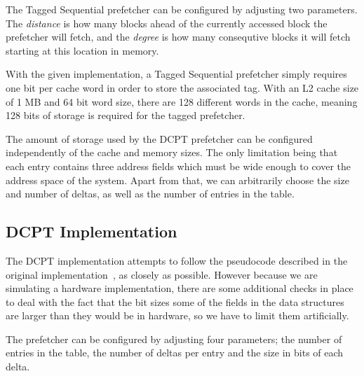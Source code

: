 
The Tagged Sequential prefetcher can be configured by adjusting two parameters.
The \emph{distance} is how many blocks ahead of the currently accessed block the
prefetcher will fetch, and the \emph{degree} is how many consequtive blocks it will
fetch starting at this location in memory.

With the given implementation, a Tagged Sequential prefetcher simply requires
one bit per cache word in order to store the associated tag. With an L2 cache
size of 1 MB and 64 bit word size, there are 128 different words in the cache,
meaning 128 bits of storage is required for the tagged prefetcher.

The amount of storage used by the DCPT prefetcher can be configured
independently of the cache and memory sizes. The only limitation being that each
entry contains three address fields which must be wide enough to cover the
address space of the system. Apart from that, we can arbitrarily choose the size
and number of deltas, as well as the number of entries in the table.


\subsection{DCPT Implementation}


The DCPT implementation attempts to follow the pseudocode described in the
original implementation~\cite{dcpt}, as closely as possible. However because we
are simulating a hardware implementation, there are some additional checks in
place to deal
with the fact that the bit sizes some of the fields in the data
structures are larger than they would be in hardware, so we have to limit them
artificially.

The prefetcher can be configured by adjusting four parameters; the number of entries
in the table, the number of deltas per entry and the size in bits of each delta.

